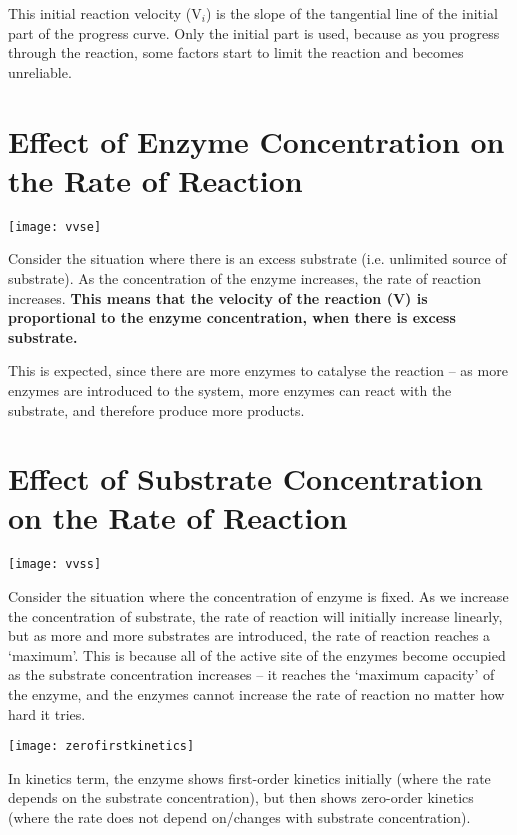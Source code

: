\documentclass[a4paper, 12pt]{report}
\begin{document}
This initial reaction velocity (V$_i$) is the slope of the tangential line of the initial part of the progress curve.
Only the initial part is used, because as you progress through the reaction, some factors start to limit the reaction and becomes unreliable.

\section{Effect of Enzyme Concentration on the Rate of Reaction}

\begin{center}
\texttt{[image: vvse]}
\end{center}

Consider the situation where there is an excess substrate (i.e. unlimited source of substrate).
As the concentration of the enzyme increases, the rate of reaction increases.
\textbf{This means that the velocity of the reaction (V) is proportional to the enzyme concentration, when there is excess substrate.}

This is expected, since there are more enzymes to catalyse the reaction -- as more enzymes are introduced to the system, more enzymes can react with the substrate, and therefore produce more products.

\section{Effect of Substrate Concentration on the Rate of Reaction}

\begin{center}
\texttt{[image: vvss]}
\end{center}

Consider the situation where the concentration of enzyme is fixed.
As we increase the concentration of substrate, the rate of reaction will initially increase linearly, but as more and more substrates are introduced, the rate of reaction reaches a `maximum'.
This is because all of the active site of the enzymes become occupied as the substrate concentration increases -- it reaches the `maximum capacity' of the enzyme, and the enzymes cannot increase the rate of reaction no matter how hard it tries.

\begin{center}
\texttt{[image: zerofirstkinetics]}
\end{center}

In kinetics term, the enzyme shows first-order kinetics initially (where the rate depends on the substrate concentration), but then shows zero-order kinetics (where the rate does not depend on/changes with substrate concentration).
\end{document}
